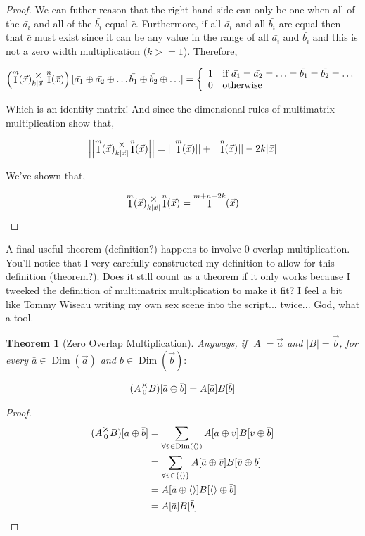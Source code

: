 \documentclass[12pt]{book}
\theoremstyle{plain}
\newtheorem{theorem}{Theorem}[chapter]
\theoremstyle{definition}
\theoremstyle{ppart}
\theoremstyle{case}
\theoremstyle{solution}
\DeclareMathOperator{\Dim}{Dim}
\DeclareMathOperator{\Ident}{I}
\newcommand{\mmult}[1]{\text{\raisebox{1ex}{$\underset{#1}{\times}$}}}
\begin{document}
\begin{landscape}
\begin{proof}
We can futher reason that the right hand side can only be one when all of the
$\bar{a_i}$ and all of the $\bar{b_i}$ equal $\bar{c}$. Furthermore, if all
$\bar{a_i}$ and all $\bar{b_i}$ are equal then that $\bar{c}$ must exist since it can
be any value in the range of all $\bar{a_i}$ and $\bar{b_i}$ and this is not a
zero width multiplication ($k >= 1$). Therefore,

\begin{align*}
\left( \Ident^m(\vec{x}) \mmult{k|\vec{x}|} \Ident^n(\vec{x}) \right)
[\bar{a_1} \oplus \bar{a_2} \oplus \ldots \bar{b_1} \oplus \bar{b_2} \oplus \ldots] =
\left\{
  \begin{array}{ll}
    1 & \mbox{if } \bar{a_1} = \bar{a_2} = \ldots = \bar{b_1} = \bar{b_2} = \ldots \\
    0 & \mbox{otherwise}
  \end{array}
\right.
\end{align*} 

Which is an identity matrix! And since the dimensional rules of multimatrix 
multiplication show that,

\[
 \left|\left| \Ident^m(\vec{x}) \mmult{k|\vec{x}|} \Ident^n(\vec{x}) \right|\right|
 =
 ||\Ident^m(\vec{x})|| + ||\Ident^n(\vec{x})|| - 2k|\vec{x}|
\]

We've shown that,

\[ \Ident^m(\vec{x}) \mmult{k|\vec{x}|} \Ident^n(\vec{x}) = \Ident^{m+n-2k}(\vec{x}) \]
\end{proof}
\end{landscape}

A final useful theorem (definition?) happens to involve 0 overlap multiplication.
You'll notice that I very carefully constructed my definition to allow for this
definition (theorem?). Does it still count as a theorem if it only works because
I tweeked the definition of multimatrix multiplication to make it fit? I feel
a bit like Tommy Wiseau writing my own sex scene into the script... twice... God,
what a tool.

\begin{theorem}[Zero Overlap Multiplication]
Anyways, if $|A| = \vec{a}$ and $|B| = \vec{b}$, for every $\bar{a} \in \Dim(\vec{a})$
and $\bar{b} \in \Dim(\vec{b}):$

\[ (A \mmult{0} B)[\bar{a} \oplus \bar{b}] = A[\bar{a}] B[\bar{b}] \]

\end{theorem}
\begin{proof}
\begin{align*}
	(A \mmult{0} B)[\bar{a} \oplus \bar{b}]
	&=
	\sum_{\forall \bar{v} \in \Dim(\left<\right>)}
	A[\bar{a} \oplus \bar{v}] B[\bar{v} \oplus \bar{b}] \\
	&=
	\sum_{\forall \bar{v} \in \left\{\left<\right>\right\}}
	A[\bar{a} \oplus \bar{v}] B[\bar{v} \oplus \bar{b}] \\
	&=
	A[\bar{a} \oplus \left<\right>] B[\left<\right> \oplus \bar{b}] \\
	&=
	A[\bar{a}] B[\bar{b}] \\
\end{align*}
\end{proof}
\end{document}
